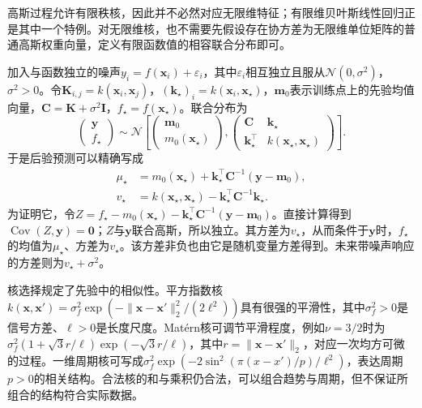 高斯过程允许有限秩核，因此并不必然对应无限维特征；有限维贝叶斯线性回归正是其中一个特例。对无限维核，也不需要先假设存在协方差为无限维单位矩阵的普通高斯权重向量，定义有限函数值的相容联合分布即可。

加入与函数独立的噪声$y_i=f(\bm{x}_i)+\varepsilon_i$，其中$\varepsilon_i$相互独立且服从$\mathcal{N}(0,\sigma^2)$，$\sigma^2>0$。令$\bm{K}_{i,j}=k(\bm{x}_i,\bm{x}_j)$，$(\bm{k}_{\star})_i=k(\bm{x}_i,\bm{x}_{\star})$，$\bm{m}_0$表示训练点上的先验均值向量，$\bm{C}=\bm{K}+\sigma^2\bm{I}$，$f_{\star}=f(\bm{x}_{\star})$。联合分布为
\[
  \begin{pmatrix}\bm{y}\\f_{\star}\end{pmatrix}
  \sim\mathcal{N}\!\left[
    \begin{pmatrix}\bm{m}_0\\m_0(\bm{x}_{\star})\end{pmatrix},
    \begin{pmatrix}
      \bm{C}&\bm{k}_{\star}\\
      \bm{k}_{\star}^{\top}&k(\bm{x}_{\star},\bm{x}_{\star})
    \end{pmatrix}\right].
\]
于是后验预测可以精确写成
\begin{equation}
  \begin{aligned}
    \mu_{\star}
      &=m_0(\bm{x}_{\star})
        +\bm{k}_{\star}^{\top}\bm{C}^{-1}(\bm{y}-\bm{m}_0),\\
    v_{\star}
      &=k(\bm{x}_{\star},\bm{x}_{\star})
        -\bm{k}_{\star}^{\top}\bm{C}^{-1}\bm{k}_{\star}.
  \end{aligned}
  \label{eq:regression-gp-posterior}
\end{equation}
为证明它，令$Z=f_{\star}-m_0(\bm{x}_{\star})-\bm{k}_{\star}^{\top}\bm{C}^{-1}(\bm{y}-\bm{m}_0)$。直接计算得到$\operatorname{Cov}(Z,\bm{y})=\bm{0}$；$Z$与$\bm{y}$联合高斯，所以独立。其方差为$v_{\star}$，从而条件于$\bm{y}$时，$f_{\star}$的均值为$\mu_{\star}$、方差为$v_{\star}$。该方差非负也由它是随机变量方差得到。未来带噪声响应的方差则为$v_{\star}+\sigma^2$。

核选择规定了先验中的相似性。平方指数核$k(\bm{x},\bm{x}')=\sigma_f^2\exp(-\lVert\bm{x}-\bm{x}'\rVert_2^2/(2\ell^2))$具有很强的平滑性，其中$\sigma_f^2>0$是信号方差、$\ell>0$是长度尺度。Matérn核可调节平滑程度，例如$\nu=3/2$时为$\sigma_f^2(1+\sqrt3r/\ell)\exp(-\sqrt3r/\ell)$，其中$r=\lVert\bm{x}-\bm{x}'\rVert_2$，对应一次均方可微的过程。一维周期核可写成$\sigma_f^2\exp(-2\sin^2(\pi(x-x')/p)/\ell^2)$，表达周期$p>0$的相关结构。合法核的和与乘积仍合法，可以组合趋势与周期，但不保证所组合的结构符合实际数据。


